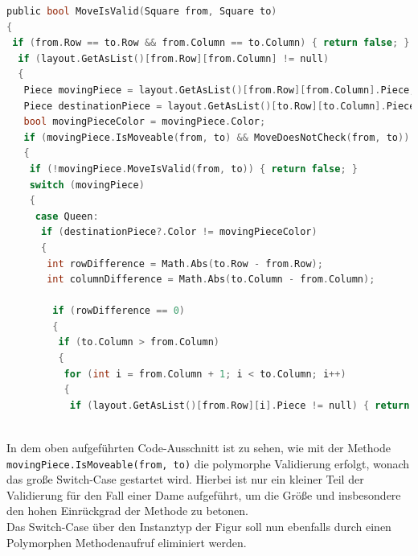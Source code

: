 \documentclass[
10pt, %
a4paper, %
oneside, %
headinclude,footinclude, %
BCOR5mm, %
]{scrartcl}
\begin{document}
\begin{onehalfspace}
\begin{lstlisting}[language=c, style=mStyle]
public bool MoveIsValid(Square from, Square to)
{
 if (from.Row == to.Row && from.Column == to.Column) { return false; }
  if (layout.GetAsList()[from.Row][from.Column] != null)
  {
   Piece movingPiece = layout.GetAsList()[from.Row][from.Column].Piece;
   Piece destinationPiece = layout.GetAsList()[to.Row][to.Column].Piece;
   bool movingPieceColor = movingPiece.Color;
   if (movingPiece.IsMoveable(from, to) && MoveDoesNotCheck(from, to))
   {
	if (!movingPiece.MoveIsValid(from, to)) { return false; }
	switch (movingPiece)
	{
	 case Queen:
	  if (destinationPiece?.Color != movingPieceColor)
	  {
	   int rowDifference = Math.Abs(to.Row - from.Row);
	   int columnDifference = Math.Abs(to.Column - from.Column);

	    if (rowDifference == 0)
		{
		 if (to.Column > from.Column)
		 {
		  for (int i = from.Column + 1; i < to.Column; i++)
		  {
		   if (layout.GetAsList()[from.Row][i].Piece != null) { return false; }
		  
\end{lstlisting}
In dem oben aufgeführten Code-Ausschnitt ist zu sehen, wie mit der Methode \texttt{movingPiece.IsMoveable(from, to)} die polymorphe Validierung erfolgt, wonach das große Switch-Case gestartet wird. Hierbei ist nur ein kleiner Teil der Validierung für den Fall einer Dame aufgeführt, um die Größe  und insbesondere den hohen Einrückgrad der Methode zu betonen. \\
Das Switch-Case über den Instanztyp der Figur soll nun ebenfalls durch einen Polymorphen Methodenaufruf eliminiert werden. 


\end{onehalfspace}
\end{document}
